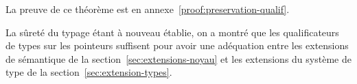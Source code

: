 La preuve de ce théorème est en annexe~\ref{proof:preservation-qualif}.

La sûreté du typage étant à nouveau établie, on a montré que les qualificateurs
de types sur les pointeurs suffisent pour avoir une adéquation entre les
extensions de sémantique de la section~\ref{sec:extensions-noyau} et les
extensions du système de type de la section~\ref{sec:extension-types}.


